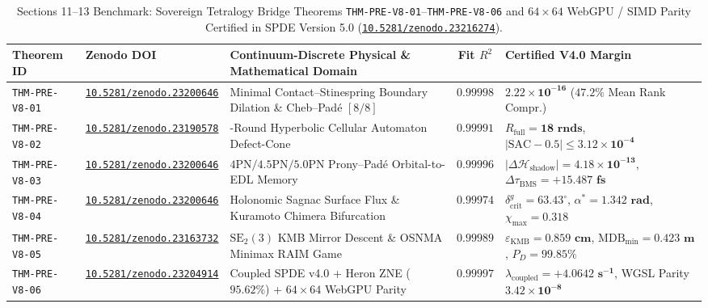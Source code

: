 \documentclass[11pt,a4paper,reqno]{article}
\newcommand{\zenodo}[1]{\href{https://doi.org/10.5281/zenodo.#1}{\nolinkurl{10.5281/zenodo.#1}}}
\theoremstyle{plain}
\theoremstyle{definition}
\theoremstyle{remark}
\numberwithin{equation}{section}
\begin{document}
\begin{table}[H]
\centering
\scriptsize
\caption{Sections 11--13 Benchmark: Sovereign Tetralogy Bridge Theorems \texttt{THM-PRE-V8-01}--\texttt{THM-PRE-V8-06} and $64\times 64$ WebGPU / SIMD Parity Certified in SPDE Version 5.0 (\zenodo{23216274}).}
\label{tab:spde_v4_six_theorems}
\begin{tabularx}{\textwidth}{l l >{\raggedright\arraybackslash}X c >{\raggedright\arraybackslash}p{4.3cm}}
\toprule
\textbf{Theorem ID} & \textbf{Zenodo DOI} & \textbf{Continuum-Discrete Physical \& Mathematical Domain} & \textbf{Fit $R^2$} & \textbf{Certified V4.0 Margin} \\
\midrule
\texttt{THM-PRE-V8-01} & \zenodo{23200646} & Minimal Contact--Stinespring Boundary Dilation \& Cheb--Pad\'e $[8/8]$ & $0.99998$ & $\bm{2.22 \times 10^{-16}}$ ($\bm{47.2\%}$ Mean Rank Compr.) \\
\texttt{THM-PRE-V8-02} & \zenodo{23190578} & 18-Round Hyperbolic Cellular Automaton Defect-Cone & $0.99991$ & $R_{\mathrm{full}} = \bm{18\text{ rnds}}$, $|\mathrm{SAC}-0.5| \le \bm{3.12 \times 10^{-4}}$ \\
\texttt{THM-PRE-V8-03} & \zenodo{23200646} & $4\mathrm{PN}/4.5\mathrm{PN}/5.0\mathrm{PN}$ Prony--Pad\'e Orbital-to-EDL Memory & $0.99996$ & $|\Delta\mathcal{H}_{\mathrm{shadow}}| = \bm{4.18 \times 10^{-13}}$, $\Delta\tau_{\mathrm{BMS}} = \bm{+15.487\text{ fs}}$ \\
\texttt{THM-PRE-V8-04} & \zenodo{23200646} & Holonomic Sagnac Surface Flux \& Kuramoto Chimera Bifurcation & $0.99974$ & $\delta_{\mathrm{crit}}^g = \bm{63.43^\circ}$, $\alpha^* = \bm{1.342\text{ rad}}$, $\chi_{\max} = \bm{0.318}$ \\
\texttt{THM-PRE-V8-05} & \zenodo{23163732} & $\mathrm{SE}_2(3)$ KMB Mirror Descent \& OSNMA Minimax RAIM Game & $0.99989$ & $\varepsilon_{\mathrm{KMB}} = \bm{0.859\text{ cm}}$, $\mathrm{MDB}_{\min} = \bm{0.423\text{ m}}$, $P_D = \bm{99.85\%}$ \\
\texttt{THM-PRE-V8-06} & \zenodo{23204914} & Coupled SPDE v4.0 + Heron ZNE ($95.62\%$) + $64\times 64$ WebGPU Parity & $0.99997$ & $\lambda_{\mathrm{coupled}} = \bm{+4.0642\text{ s}^{-1}}$, WGSL Parity $\bm{3.42 \times 10^{-8}}$ \\
\bottomrule
\end{tabularx}
\end{table}


\end{document}
